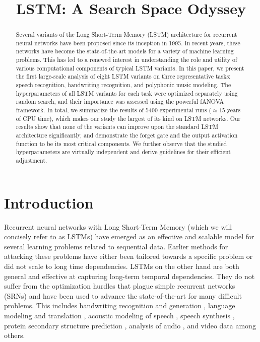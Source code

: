 \title{LSTM: A Search Space Odyssey}

\begin{abstract}
Several variants of the  Long Short-Term Memory (LSTM) architecture for recurrent neural networks have been proposed since its inception in 1995. In recent years, these networks have become the state-of-the-art models for a variety of machine learning problems. This has led to a renewed interest in understanding the role and utility of various computational components of typical LSTM variants. In this paper, we present the first large-scale analysis of eight LSTM variants on three representative tasks: speech recognition, handwriting recognition, and polyphonic music modeling. The hyperparameters of all LSTM variants for each task were optimized separately using random search, and their importance was assessed using the powerful fANOVA framework. In total, we summarize the results of 5400 experimental runs ($\approx 15$ years of CPU time), which makes our study the largest of its kind on LSTM networks. Our results show that none of the variants can improve upon the standard LSTM architecture significantly, and demonstrate the forget gate and the output activation function to be its most critical components. We further observe that the studied hyperparameters are virtually independent and derive guidelines for their efficient adjustment.
\end{abstract}

\section{Introduction}
Recurrent neural networks with Long Short-Term Memory (which we will concisely refer to as LSTMs) have emerged as an effective and scalable model for several learning problems related to sequential data. Earlier methods for attacking these problems have either been tailored towards a specific problem or did not scale to long time dependencies. LSTMs on the other hand are both general and effective at capturing long-term temporal dependencies. They do not suffer from the optimization hurdles that plague simple recurrent networks (SRNs) \cite{Hochreiter1991, Hochreiter2001} and have been used to advance the state-of-the-art for many difficult problems. This includes handwriting recognition \cite{Graves2009,Pham2013,Doetsch2014} and generation \cite{Graves2013d}, language modeling \cite{Zaremba2014} and translation \cite{Luong2014}, acoustic modeling of speech \cite{Sak2014}, speech synthesis \cite{Fan2014}, protein secondary structure prediction \cite{Sonderby2014}, analysis of audio \cite{Marchi2014}, and video data \cite{Donahue2014} among others.

